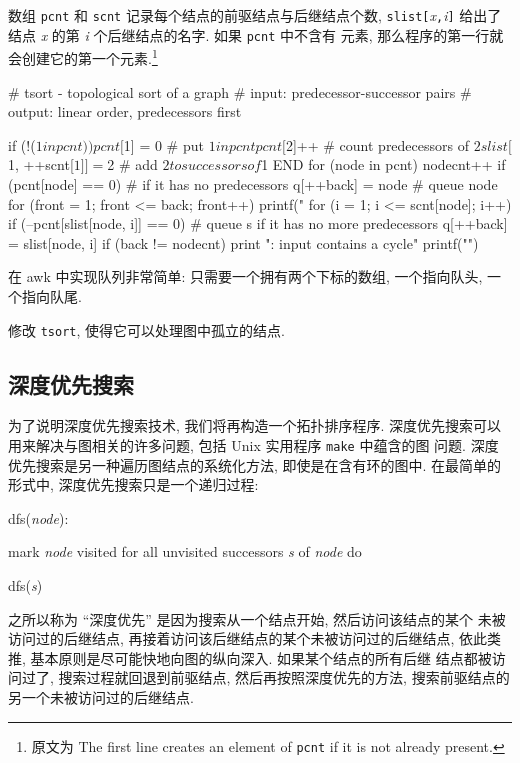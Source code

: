 数组 \texttt{pcnt} 和 \texttt{scnt} 记录每个结点的前驱结点与后继结点个数,
\texttt{slist[}\textit{x}\texttt{,}\textit{i}\texttt{]} 给出了结点 
\textit{x} 的第 \textit{i} 个后继结点的名字. 如果 \texttt{pcnt} 中不含有
元素, 那么程序的第一行就会创建它的第一个元素.\footnote{原文为 The first
line creates an element of \texttt{pcnt} if it is not already present.}
\begin{awkcode}
    # tsort - topological sort of a graph
    #   input:  predecessor-successor pairs
    #   output: linear order, predecessors first

        { if (!($1 in pcnt))
              pcnt[$1] = 0           # put $1 in pcnt
          pcnt[$2]++                 # count predecessors of $2
          slist[$1, ++scnt[$1]] = $2 # add $2 to successors of $1
        }
    END { for (node in pcnt) {
              nodecnt++
              if (pcnt[node] == 0)   # if it has no predecessors
                  q[++back] = node   # queue node
          }
          for (front = 1; front <= back; front++) {
              printf(" %
              for (i = 1; i <= scnt[node]; i++)
                  if (--pcnt[slist[node, i]] == 0)
                      # queue s if it has no more predecessors
                      q[++back] = slist[node, i]
          }
          if (back != nodecnt)
              print "\nerror: input contains a cycle"
          printf("\n")
        }
\end{awkcode}

在 awk 中实现队列非常简单: 只需要一个拥有两个下标的数组, 一个指向队头, 
一个指向队尾.

\begin{exercise}
    修改 \texttt{tsort}, 使得它可以处理图中孤立的结点.
\end{exercise}

\subsection{深度优先搜索}
\label{subsec:depth_first_search}

为了说明深度优先搜索技术, 我们将再构造一个拓扑排序程序. 深度优先搜索可以
用来解决与图相关的许多问题, 包括 Unix 实用程序 \texttt{make} 中蕴含的图
问题. 深度优先搜索是另一种遍历图结点的系统化方法, 即使是在含有环的图中.
在最简单的形式中, 深度优先搜索只是一个递归过程:
\begin{pattern}
    \indent dfs(\textit{node}): \par
    \indent\indent mark \textit{node} visited
    \indent\indent for all unvisited successors \textit{s} of \textit{node}
                do \par
    \indent\indent\indent dfs(\textit{s})
\end{pattern}
之所以称为 ``深度优先'' 是因为搜索从一个结点开始, 然后访问该结点的某个
未被访问过的后继结点, 再接着访问该后继结点的某个未被访问过的后继结点,
依此类推, 基本原则是尽可能快地向图的纵向深入. 如果某个结点的所有后继
结点都被访问过了, 搜索过程就回退到前驱结点, 然后再按照深度优先的方法,
搜索前驱结点的另一个未被访问过的后继结点.

